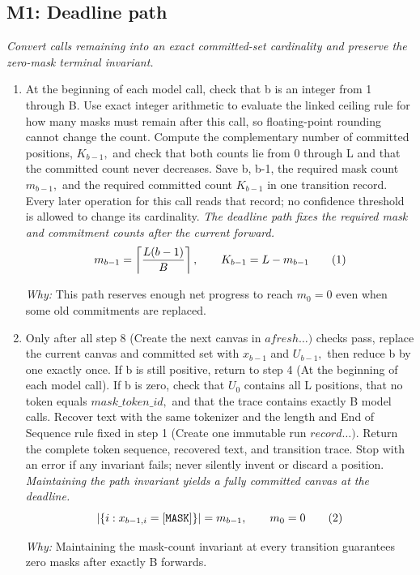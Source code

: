 \documentclass[10pt,a4paper]{article}
\begin{document}
\subsection*{M1: Deadline path}
\emph{Convert calls remaining into an exact committed-set cardinality and preserve the zero-mask terminal invariant.}
\begin{enumerate}[leftmargin=*,start=4]
  \item At the beginning of each model call, check that b is an integer from 1 through B. Use exact integer arithmetic to evaluate the linked ceiling rule for how many masks must remain after this call, so floating-point rounding cannot change the count. Compute the complementary number of committed positions, \(K_{b-1},\) and check that both counts lie from 0 through L and that the committed count never decreases. Save b, b-1, the required mask count \(m_{b-1},\) and the required committed count \(K_{b-1}\) in one transition record. Every later operation for this call reads that record;\allowbreak{} no confidence threshold is allowed to change its cardinality.
\noindent\emph{The deadline path fixes the required mask and commitment counts after the current forward.}
\begin{equation}
\resizebox{\ifdim\width>\linewidth \linewidth\else\width\fi}{!}{$\displaystyle m_{b-1}=\left\lceil \frac{L(b-1)}{B} \right\rceil,\qquad K_{b-1}=L-m_{b-1}$} \tag{1}
\end{equation}
\par\emph{Why:} This path reserves enough net progress to reach \(m_{0}=0\) even when some old commitments are replaced.
  \item Only after all step 8 (Create the next canvas in \(a fresh\dots )\) checks pass, replace the current canvas and committed set with \(x_{b-1}\) and \(U_{b-1},\) then reduce b by one exactly once. If b is still positive, return to step 4 (At the beginning of each model call). If b is zero, check that \(U_{0}\) contains all L positions, that no token equals \(\mathit{mask\_token\_id},\) and that the trace contains exactly B model calls. Recover text with the same tokenizer and the length and End of Sequence rule fixed in step 1 (Create one immutable run \(record\dots ).\) Return the complete token sequence, recovered text, and transition trace. Stop with an error if any invariant fails;\allowbreak{} never silently invent or discard a position.
\noindent\emph{Maintaining the path invariant yields a fully committed canvas at the deadline.}
\begin{equation}
\resizebox{\ifdim\width>\linewidth \linewidth\else\width\fi}{!}{$\displaystyle |\{i:x_{b-1,i}=\mathtt{[MASK]}\}|=m_{b-1},\qquad m_0=0$} \tag{2}
\end{equation}
\par\emph{Why:} Maintaining the mask-count invariant at every transition guarantees zero masks after exactly B forwards.
\end{enumerate}
\end{document}
